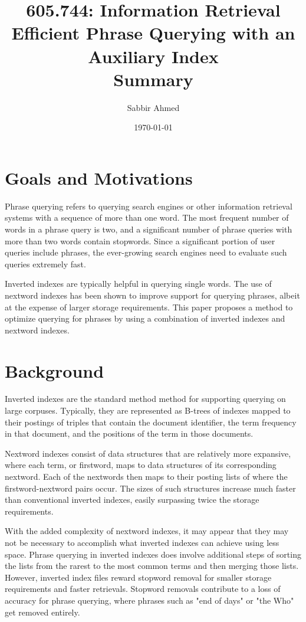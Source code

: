 \documentclass[11pt]{article}
\title{605.744: Information Retrieval \\ Efficient Phrase Querying with an Auxiliary Index \\ Summary}
\author{Sabbir Ahmed}
\date{\today}
\begin{document}
\maketitle

    \section*{Goals and Motivations}

    Phrase querying refers to querying search engines or other information retrieval systems with a sequence of more than one word. The most frequent number of words in a phrase query is two, and a significant number of phrase queries with more than two words contain stopwords. Since a significant portion of user queries include phrases, the ever-growing search engines need to evaluate such queries extremely fast.

    Inverted indexes are typically helpful in querying single words. The use of nextword indexes has been shown to improve support for querying phrases, albeit at the expense of larger storage requirements. This paper proposes a method to optimize querying for phrases by using a combination of inverted indexes and nextword indexes.

    \section*{Background}

    Inverted indexes are the standard method method for supporting querying on large corpuses. Typically, they are represented as B-trees of indexes mapped to their postings of triples that contain the document identifier, the term frequency in that document, and the positions of the term in those documents.

    Nextword indexes consist of data structures that are relatively more expansive, where each term, or firstword, maps to data structures of its corresponding nextword. Each of the nextwords then maps to their posting lists of where the firstword-nextword pairs occur. The sizes of such structures increase much faster than conventional inverted indexes, easily surpassing twice the storage requirements.

    With the added complexity of nextword indexes, it may appear that they may not be necessary to accomplish what inverted indexes can achieve using less space. Phrase querying in inverted indexes does involve additional steps of sorting the lists from the rarest to the most common terms and then merging those lists. However, inverted index files reward stopword removal for smaller storage requirements and faster retrievals. Stopword removals contribute to a loss of accuracy for phrase querying, where phrases such as "end of days" or "the Who" get removed entirely.
\end{document}
